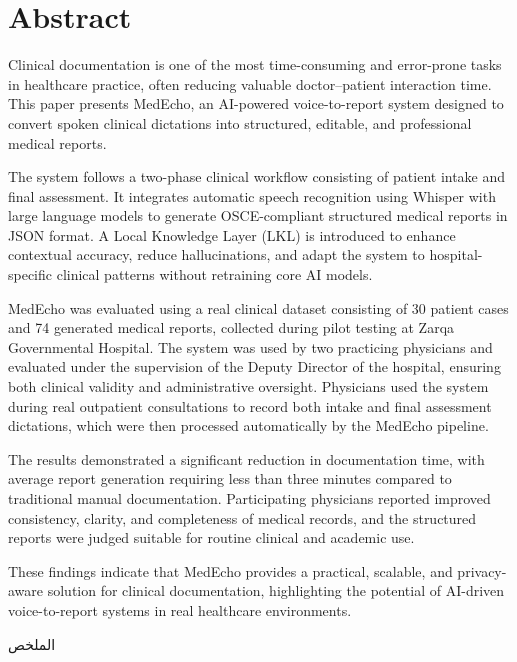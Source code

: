 
\chapter*{Abstract}
Clinical documentation is one of the most time-consuming and error-prone tasks in healthcare practice, often reducing valuable doctor–patient interaction time. This paper presents MedEcho, an AI-powered voice-to-report system designed to convert spoken clinical dictations into structured, editable, and professional medical reports.

The system follows a two-phase clinical workflow consisting of patient intake and final assessment. It integrates automatic speech recognition using Whisper with large language models to generate OSCE-compliant structured medical reports in JSON format. A Local Knowledge Layer (LKL) is introduced to enhance contextual accuracy, reduce hallucinations, and adapt the system to hospital-specific clinical patterns without retraining core AI models.

MedEcho was evaluated using a real clinical dataset consisting of 30 patient cases and 74 generated medical reports, collected during pilot testing at Zarqa Governmental Hospital. The system was used by two practicing physicians and evaluated under the supervision of the Deputy Director of the hospital, ensuring both clinical validity and administrative oversight. Physicians used the system during real outpatient consultations to record both intake and final assessment dictations, which were then processed automatically by the MedEcho pipeline.

The results demonstrated a significant reduction in documentation time, with average report generation requiring less than three minutes compared to traditional manual documentation. Participating physicians reported improved consistency, clarity, and completeness of medical records, and the structured reports were judged suitable for routine clinical and academic use.

These findings indicate that MedEcho provides a practical, scalable, and privacy-aware solution for clinical documentation, highlighting the potential of AI-driven voice-to-report systems in real healthcare environments.

\vspace{1cm}

\begin{center}
\textarabic{\Large الملخص}
\end{center}

